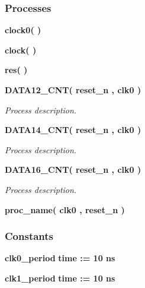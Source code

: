 \subsubsection*{Processes}
 \begin{DoxyCompactItemize}
\item 
{\bf clock0}{\bfseries  (  )}
\item 
{\bf clock}{\bfseries  (  )}
\item 
{\bf res}{\bfseries  (  )}
\item 
{\bf D\+A\+T\+A12\+\_\+\+C\+NT}{\bfseries  ( {\bfseries {\bfseries {\bf reset\+\_\+n}} \textcolor{vhdlchar}{ }} , {\bfseries {\bfseries {\bf clk0}} \textcolor{vhdlchar}{ }} )}
\begin{DoxyCompactList}\small\item\em Process description. \end{DoxyCompactList}\item 
{\bf D\+A\+T\+A14\+\_\+\+C\+NT}{\bfseries  ( {\bfseries {\bfseries {\bf reset\+\_\+n}} \textcolor{vhdlchar}{ }} , {\bfseries {\bfseries {\bf clk0}} \textcolor{vhdlchar}{ }} )}
\begin{DoxyCompactList}\small\item\em Process description. \end{DoxyCompactList}\item 
{\bf D\+A\+T\+A16\+\_\+\+C\+NT}{\bfseries  ( {\bfseries {\bfseries {\bf reset\+\_\+n}} \textcolor{vhdlchar}{ }} , {\bfseries {\bfseries {\bf clk0}} \textcolor{vhdlchar}{ }} )}
\begin{DoxyCompactList}\small\item\em Process description. \end{DoxyCompactList}\item 
{\bf proc\+\_\+name}{\bfseries  ( {\bfseries {\bfseries {\bf clk0}} \textcolor{vhdlchar}{ }} , {\bfseries {\bfseries {\bf reset\+\_\+n}} \textcolor{vhdlchar}{ }} )}
\end{DoxyCompactItemize}
\subsubsection*{Constants}
 \begin{DoxyCompactItemize}
\item 
{\bf clk0\+\_\+period} {\bfseries \textcolor{comment}{time}\textcolor{vhdlchar}{ }\textcolor{vhdlchar}{ }\textcolor{vhdlchar}{\+:}\textcolor{vhdlchar}{=}\textcolor{vhdlchar}{ }\textcolor{vhdlchar}{ }\textcolor{vhdlchar}{ } \textcolor{vhdldigit}{10} \textcolor{vhdlchar}{ }\textcolor{vhdlchar}{ns}\textcolor{vhdlchar}{ }} 
\item 
{\bf clk1\+\_\+period} {\bfseries \textcolor{comment}{time}\textcolor{vhdlchar}{ }\textcolor{vhdlchar}{ }\textcolor{vhdlchar}{\+:}\textcolor{vhdlchar}{=}\textcolor{vhdlchar}{ }\textcolor{vhdlchar}{ }\textcolor{vhdlchar}{ } \textcolor{vhdldigit}{10} \textcolor{vhdlchar}{ }\textcolor{vhdlchar}{ns}\textcolor{vhdlchar}{ }} 
\end{DoxyCompactItemize}
